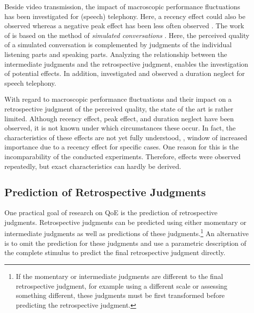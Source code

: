 Beside video transmission, the impact of macroscopic performance fluctuations has been investigated for (speech) telephony. %
Here, a recency effect could also be observed \citep[\eg,][]{rosenbluth_testing_1998, hamberg_time-varying_1999, gros_instantaneous_2001, gros_effects_2004, belmudez_audiovisual_2015, weiss_modeling_2009, lewcio_management_2014} whereas a negative peak effect has been less often observed \citep[\eg,][]{weiss_modeling_2009, belmudez_audiovisual_2015, lewcio_management_2014}.
The work of \citet{weiss_modeling_2009, lewcio_management_2014, belmudez_audiovisual_2015} is based on the method of \emph{simulated conversations} \citep{etsi_speech_2011}.
Here, the perceived quality of a simulated conversation is complemented by judgments of the individual listening parts and speaking parts.
Analyzing the relationship between the intermediate judgments and the retrospective judgment, enables the investigation of potential effects.
In addition, \citet{rosenbluth_testing_1998} investigated and observed a duration neglect for speech telephony.

With regard to macroscopic performance fluctuations and their impact on a retrospective judgment of the perceived quality, the state of the art is rather limited.
Although recency effect, peak effect, and duration neglect have been observed, it is not known under which circumstances these occur.
In fact, the characteristics of these effects are not yet fully understood, \eg, window of increased importance due to a recency effect for specific cases.
One reason for this is the incomparability of the conducted experiments.
Therefore, effects were observed repeatedly, but exact characteristics can hardly be derived.

\subsection{Prediction of Retrospective Judgments}
One practical goal of research on \ac{QoE} is the prediction of retrospective judgments.
Retrospective judgments can be predicted using either momentary or intermediate judgments as well as predictions of these judgments.\footnote{If the momentary or intermediate judgments are different to the final retrospective judgment, for example using a different scale or assessing something different, these judgments must be first transformed before predicting the retrospective judgment.}
An alternative is to omit the prediction for these judgments and use a parametric description of the complete stimulus to predict the final retrospective judgment directly.

